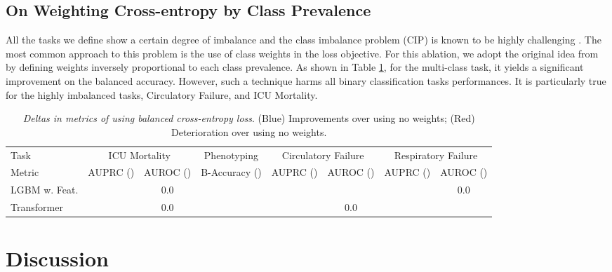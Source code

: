 \documentclass{article}
\begin{document}
\subsection{On Weighting Cross-entropy by Class Prevalence }\label{ablation:weight}
All the tasks we define show a certain degree of imbalance and the class imbalance problem (CIP) is known to be highly challenging \cite{johnson2019survey}. The most common approach to this problem is the use of class weights in the loss objective. For this ablation, we adopt the original idea from \citep{king2001logistic} by defining weights inversely proportional to each class prevalence. As shown in Table \ref{tab:weighting-impact}, for the multi-class task, it yields a significant improvement on the balanced accuracy. However, such a technique harms all binary classification tasks performances. It is particularly true for the highly imbalanced tasks, Circulatory Failure, and ICU Mortality.

\begin{table}[!ht]
    \centering
    \footnotesize
    \setlength\tabcolsep{1.5pt}
    \caption{\textit{Deltas in metrics of using balanced cross-entropy loss}. (Blue) Improvements over using no weights; (Red) Deterioration over using no weights.   }
\begin{tabular}{l|cc|c|cc|cc}
\toprule
Task & \multicolumn{2}{c|}{ICU Mortality} & Phenotyping & \multicolumn{2}{c|}{Circulatory Failure} & \multicolumn{2}{c}{Respiratory Failure} \\
 Metric & AUPRC () & AUROC () & B-Accuracy () &      AUPRC () & AUROC () &  AUPRC () & AUROC () \\
\midrule
LGBM w. Feat. &               \color{red}{-1.3} &                0.0 &                    \color{RoyalBlue}{+4.3} &                    \color{red}{-4.2} &                \color{red}{-2.6} &               \color{RoyalBlue}{0.1} &               0.0 \\
Transformer &               \color{red}{-2.6} &                0.0 &                    \color{RoyalBlue}{+4.0} &                    \color{red}{-0.9} &               0.0 &                \color{red}{-0.1} &               \color{red}{-0.1} \\
\bottomrule
\end{tabular}

    \label{tab:weighting-impact}
\end{table}




 \section{Discussion}\label{disc}
\end{document}
